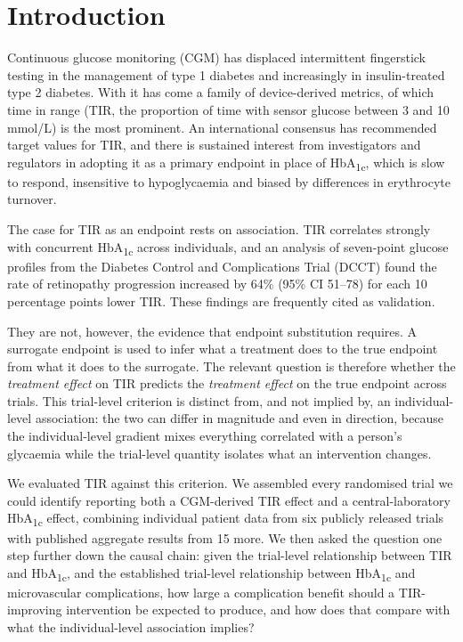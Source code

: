 \documentclass[11pt,a4paper]{article}
\newcommand{\pp}{percentage points}
\begin{document}
\clearpage

\section{Introduction}

Continuous glucose monitoring (CGM) has displaced intermittent fingerstick testing in the management of
type 1 diabetes and increasingly in insulin-treated type 2 diabetes. With it has come a family of
device-derived metrics, of which time in range (TIR, the proportion of time with sensor glucose between
3 and 10 mmol/L) is the most prominent. An international consensus
has recommended target values for TIR,\citep{battelino2019} and there is sustained interest from
investigators and regulators in adopting it as a primary endpoint in place of
HbA\textsubscript{1c},\citep{fda2023} which is slow to respond, insensitive to hypoglycaemia and biased by
differences in erythrocyte turnover.\citep{bergenstal2018}

The case for TIR as an endpoint rests on association. TIR correlates strongly with concurrent
HbA\textsubscript{1c} across individuals,\citep{nathan2008,bergenstal2018} and an analysis of seven-point
glucose profiles from the Diabetes Control and Complications Trial (DCCT) found the rate of retinopathy
progression increased by 64\% (95\% CI 51--78) for each 10 \pp{} lower TIR.\citep{beck2019tir} These findings
are frequently cited as validation.

They are not, however, the evidence that endpoint substitution requires.\citep{prentice1989} A surrogate
endpoint is used to infer what a treatment does to the true endpoint from what it does to the surrogate. The
relevant question is therefore whether the \emph{treatment effect} on TIR predicts the \emph{treatment
effect} on the true endpoint across trials.\citep{buyse1998} This trial-level criterion is distinct from, and
not implied by, an individual-level association: the two can differ in magnitude and even in direction, because the individual-level gradient
mixes everything correlated with a person's glycaemia while the trial-level quantity isolates what an
intervention changes.

We evaluated TIR against this criterion. We assembled every randomised trial we could identify reporting
both a CGM-derived TIR effect and a central-laboratory HbA\textsubscript{1c} effect, combining individual
patient data from six publicly released trials with published aggregate results from 15 more. We then asked
the question one step further down the causal chain: given the trial-level relationship between TIR and
HbA\textsubscript{1c}, and the established trial-level relationship between HbA\textsubscript{1c} and
microvascular complications, how large a complication benefit should a TIR-improving intervention be
expected to produce, and how does that compare with what the individual-level association implies?
\end{document}

